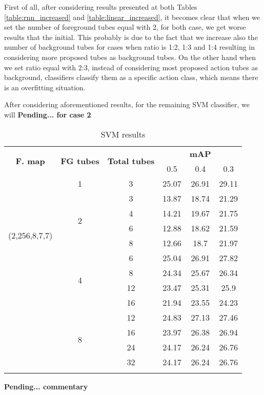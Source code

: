First of all, after considering results presented at both Tables \ref{table:rnn_increased} and \ref{table:linear_increased}, it becomes clear that when we
set the number of foreground tubes equal with 2, for both case, we get worse results that the initial. This probably is due to the fact that we increase
also the number of background tubes for cases when ratio is 1:2, 1:3 and 1:4 resulting in considering more proposed tubes as background tubes. On the other
hand when we set ratio equal with 2:3, instead of considering most proposed action tubes as background, classifiers classify them as a specific action class,
which means there is an overfitting situation. \par
After considering aforementioned results, for the remaining SVM classifier, we will \textbf{Pending... for case 2}

\begin{center}
  \setlength{\tabcolsep}{2pt}
  \begin{longtable}{|| c | c | c || c c c||}


    \hline
    \multirow{2}{*}{\textbf{F. map}} & \multirow{2}{*}{\textbf{FG tubes}} & \multirow{2}{*}{\textbf{Total tubes}} & {} & \textbf{mAP} & {} \\
    {}  & {} & {} & 0.5 & 0.4 & 0.3 \\
    \hline
    \multirow{8}{*}{(2,256,8,7,7)} & 1 & 3 & 25.07 & 26.91 & 29.11\\
    \cline{2-6}
    {} & \multirow{4}{*}{2} & 3 & 13.87 & 18.74 & 21.29 \\
    \cline{3-6}
    {} & {} & 4 & 14.21 & 19.67 & 21.75 \\
    \cline{3-6}
    {} & {} & 6 & 12.88 & 18.62 & 21.59 \\
    \cline{3-6}
    {} & {} & 8 & 12.66 & 18.7 & 21.97 \\
    \cline{2-6}
    {} & \multirow{4}{*}{4} & 6 & 25.04 & 26.91 & 27.82  \\
    \cline{3-6}
    {} & {} &  8 & 24.34 & 25.67 & 26.34 \\
    \cline{3-6}
    {} & {} & 12 &  23.47 & 25.31 & 25.9 \\
    \cline{3-6}
    {} & {} & 16 & 21.94 & 23.55 & 24.23 \\
    \cline{2-6}
    {} & \multirow{4}{*}{8} & 12 & 24.83 & 27.13 & 27.46 \\
    \cline{3-6}
    {} & {} & 16 & 23.97 & 26.38 & 26.94 \\
    \cline{3-6}
    {} & {} & 24 & 24.17 & 26.24 & 26.76 \\
    \cline{3-6}
    {} & {} & 32 & 24.17 & 26.24 & 26.76 \\

    \hline

    \caption{SVM results }
    \label{table:svm_increased}
  \end{longtable}
\end{center}
\textbf{Pending... commentary}

